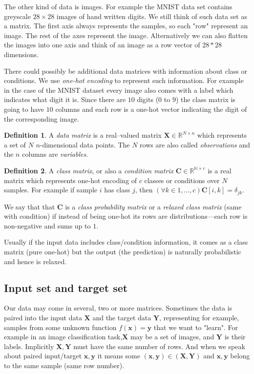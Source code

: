 \documentclass[11pt, a4paper]{report}
\theoremstyle{plain}
\theoremstyle{definition}
\newtheorem{mydef}{Definition}[chapter]
\theoremstyle{remark}
\newcommand{\N}{\mathbb{N}}
\newcommand{\R}{\mathbb{R}}
\newcommand{\X}{\mathbf{X}}
\newcommand{\x}{\mathbf{x}}
\newcommand{\Y}{\mathbf{Y}}
\newcommand{\y}{\mathbf{y}}
\newcommand{\bv}[1]{\boldsymbol{#1}}
\begin{document}
The other kind of data is images. For example the MNIST data set contains 
greyscale $28 \times 28$ images of hand written digits.
We still think of such data set as a matrix. The first axis always represents
the samples, so each "row" represent an image. The rest of the axes represent
the image. Alternatively we can also flatten the images into one axis and think
of an image as a row vector of $28*28$ dimensions.

There could possibly be additional data matrices with information about
class or conditions. We use \emph{one-hot encoding} to represent such
information.
For example in the case of the MNIST dataset every image also comes with a label
which indicates what digit it is. Since there are $10$ digits ($0$
to $9$) the class matrix is going to have $10$ columns and each row is a one-hot
vector indicating the digit of the corresponding image.

\begin{mydef}
\label{def:datamatrix}
A \emph{data matrix} is a real--valued matrix $\bv{X} \in \R^{N \times n}$
which represents a set of $N$ $n$-dimensional data points.
The $N$ rows are also called \emph{observations} and the $n$ columns are
\emph{variables}.
\end{mydef}

\begin{mydef}
\label{def:classmatrix}
A \emph{class matrix}, or also a \emph{condition matrix}
$\bv{C} \in \R^{\N \times c}$ is a real matrix which
represents one-hot encoding of $c$ classes or conditions over $N$ samples.
For example if sample $i$ has class $j$, then 
$(\forall k\in 1, \dots, c) \bv{C}[i,k] = \delta_{jk}$.

We say that that $\bv{C}$ is a \emph{class probability matrix} or a \emph{relaxed
class matrix} (same with condition)
if instead of being one-hot its rows are distributions---each row is
non-negative and sums up to $1$.
\end{mydef}

Usually if the input data includes class/condition information, it comes as a
class matrix (pure one-hot) but the output (the prediction) is naturally 
probabilistic and hence is relaxed.

\subsection{Input set and target set}
Our data may come in several, two or more matrices. 
Sometimes the data is paired into the input data $\X$ and the
target data $\Y$, 
representing for example, samples from some unknown function $f(\x) = \y$
that we want to "learn".
For example in an image classification task,$\X$ may be a set of images,
and $\Y$ is their labels.
Implicitly $\X,\Y$ must have the same number of rows. And when we speak about 
paired input/target $\x,\y$ it means some $(\x,\y) \in (\X,\Y)$ and $\x,\y$
belong to the same sample (same row number).
\end{document}
